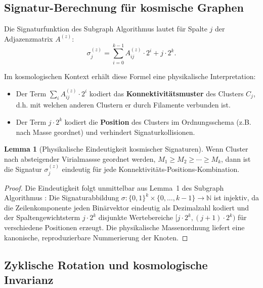 ﻿\documentclass[a4paper,12pt]{article}
\theoremstyle{definition}
\newtheorem{lemma}{Lemma}[section]
\theoremstyle{remark}
\begin{document}
\subsection{Signatur-Berechnung für kosmische Graphen}

Die Signaturfunktion des Subgraph Algorithmus \cite{eppsubgraph2026} lautet
für Spalte $j$ der Adjazenzmatrix $A^{(z)}$:
\begin{equation}
  \label{eq:sig_cosmic}
  \sigma_j^{(z)} = \sum_{i=0}^{k-1} A^{(z)}_{ij} \cdot 2^i + j \cdot 2^k.
\end{equation}

Im kosmologischen Kontext erhält diese Formel eine physikalische Interpretation:

\begin{itemize}
  \item Der Term $\sum_{i} A^{(z)}_{ij} \cdot 2^i$ kodiert das
    \textbf{Konnektivitätsmuster} des Clusters $C_j$, d.h. mit welchen anderen
    Clustern er durch Filamente verbunden ist.
  \item Der Term $j \cdot 2^k$ kodiert die \textbf{Position} des Clusters im
    Ordnungsschema (z.B. nach Masse geordnet) und verhindert Signaturkollisionen.
\end{itemize}

\begin{lemma}[Physikalische Eindeutigkeit kosmischer Signaturen]
  \label{lem:eindeutigkeit_kosmisch}
  Wenn Cluster nach absteigender Virialmassse geordnet werden,
  $M_1 \geq M_2 \geq \cdots \geq M_k$, dann ist die Signatur
  $\sigma_j^{(z)}$ eindeutig für jede Konnektivitäts-Positions-Kombination.
\end{lemma}

\begin{proof}
  Die Eindeutigkeit folgt unmittelbar aus Lemma~1 des Subgraph Algorithmus
  \cite{eppsubgraph2026}: Die Signaturabbildung
  $\sigma: \{0,1\}^k \times \{0,\ldots,k-1\} \to \mathbb{N}$ ist injektiv,
  da die Zeilenkomponente jeden Binärvektor eindeutig als Dezimalzahl kodiert
  und der Spaltengewichtsterm $j \cdot 2^k$ disjunkte Wertebereiche
  $[j \cdot 2^k, (j+1)\cdot 2^k)$ für verschiedene Positionen erzeugt.
  Die physikalische Massenordnung liefert eine kanonische, reproduzierbare
  Nummerierung der Knoten.
\end{proof}

\subsection{Zyklische Rotation und kosmologische Invarianz}
\end{document}
